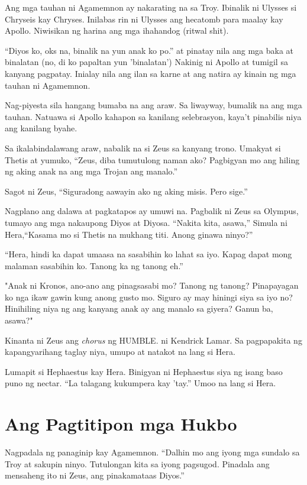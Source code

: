 \documentclass[12pt,letterpaper]{report}
\begin{document}
Ang mga tauhan ni Agamemnon ay nakarating na sa Troy. Ibinalik ni Ulysses si Chryseis kay Chryses. Inilabas rin ni Ulysses ang hecatomb para maalay kay Apollo. Niwisikan ng harina ang mga ihahandog (ritwal shit).

``Diyos ko, oks na, binalik na yun anak ko po.'' at pinatay nila ang mga baka at binalatan
(no, di ko papaltan yun 'binalatan') Nakinig ni Apollo at tumigil sa kanyang pagpatay. Inialay nila ang ilan sa karne at ang natira ay kinain ng mga tauhan ni Agamemnon.

Nag-piyesta sila hangang bumaba na ang araw. Sa liwayway, bumalik na ang mga tauhan. Natuawa si Apollo kahapon sa kanilang selebrasyon, kaya't pinabilis niya ang kanilang byahe.

Sa ikalabindalawang araw, nabalik na si Zeus sa kanyang trono. Umakyat si Thetis at yumuko, ``Zeus, diba tumutulong naman ako? Pagbigyan mo ang hiling ng aking anak na ang mga Trojan ang manalo.''

Sagot ni Zeus, ``Siguradong aawayin ako ng aking misis. Pero sige.''

Nagplano ang dalawa at pagkatapos ay umuwi na. Pagbalik ni Zeus sa Olympus, tumayo ang mga nakaupong Diyos at Diyosa. ``Nakita kita, asawa,'' Simula ni Hera,``Kasama mo si Thetis na mukhang titi. Anong ginawa ninyo?''

``Hera, hindi ka dapat umaasa na sasabihin ko lahat sa iyo. Kapag dapat mong malaman sasabihin ko. Tanong ka ng tanong eh.''

"Anak ni Kronos, ano-ano ang pinagsasabi mo? Tanong ng tanong?
Pinapayagan ko nga ikaw gawin kung anong gusto mo. Siguro ay may hiningi siya sa iyo no?
Hinihiling niya ng ang kanyang anak ay ang manalo sa giyera? Ganun ba, asawa?"

Kinanta ni Zeus ang \textit{chorus} ng HUMBLE. ni Kendrick Lamar. Sa pagpapakita ng kapangyarihang taglay niya, umupo at natakot na lang si Hera.

Lumapit si Hephaestus kay Hera. Binigyan ni Hephaestus siya ng isang baso puno ng nectar. ``La talagang kukumpera kay 'tay.'' Umoo na lang si Hera.

\pagebreak
\chapter{Ang Pagtitipon mga Hukbo}

Nagpadala ng panaginip kay Agamemnon. ``Dalhin mo ang iyong mga sundalo sa Troy at sakupin ninyo. Tutulongan kita sa iyong pagsugod. Pinadala ang mensaheng ito ni Zeus, ang pinakamataas Diyos.''
\end{document}

